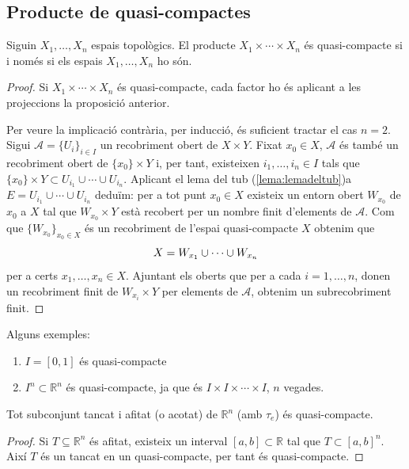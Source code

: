 \documentclass[../main.tex]{subfiles}
\begin{document}
\subsection{Producte de quasi-compactes}

\begin{ter}
\label{ter:productedespaisqc} Siguin $X_1,\ldots,X_n$ espais topològics. El producte $X_1\times \cdots\times X_n$ és quasi-compacte si i només si els espais $X_1,\ldots,X_n$ ho són.
\end{ter}
\begin{proof}
Si $X_1\times \cdots\times X_n$ és quasi-compacte, cada factor ho és aplicant a les projeccions la proposició anterior.

Per veure la implicació contrària, per inducció, és suficient tractar el cas $n = 2$. Sigui $\mathcal{A}=\{U_i\}_{i\in I}$ un recobriment obert de $X\times Y$. Fixat $x_0\in X$, $\mathcal{A}$ és també un recobriment obert de $\{x_0\}\times Y$ i, per tant, existeixen $i_1,\ldots,i_n\in I$ tals que $\{x_0\}\times Y\subset U_{i_1}\cup\cdots\cup U_{i_n}$. Aplicant el lema del tub (\ref{lema:lemadeltub})a $E = U_{i_1}\cup\cdots\cup U_{i_n}$ deduïm: per a tot punt $x_0\in X$ existeix un entorn obert $W_{x_0}$ de $x_0$ a $X$ tal que $W_{x_0}\times Y$ està recobert per un nombre finit d'elements de $\mathcal{A}$. Com que $\{W_{x_0}\}_{x_0\in X}$ és un recobriment de l'espai quasi-compacte $X$ obtenim que 
\begin{equation}
    \notag
    X = W_{x_1}\cup\cdots\cup W_{x_n}
\end{equation}
per a certs $x_1,\ldots,x_n\in X$. Ajuntant els oberts que per a cada $i=1,\ldots,n$, donen un recobriment finit de $W_{x_i}\times Y$ per elements de $\mathcal{A}$, obtenim un subrecobriment finit.
\end{proof}

\begin{ej}
\label{ej:producteqc} Alguns exemples:
\begin{enumerate}[(1)]
    \item $I = [0,1]$ és quasi-compacte
    \item $I^n\subset\mathbb{R}^n$ és quasi-compacte, ja que és $I\times I\times\cdots\times I$, $n$ vegades.
\end{enumerate}
\end{ej}

\begin{coro}
\label{coro:producteeq} Tot subconjunt tancat i afitat (o acotat) de $\mathbb{R}^n$ (amb $\tau_e$) és quasi-compacte.
\end{coro}
\begin{proof}
 Si $T\subseteq\mathbb{R}^n$ és afitat, existeix un interval $[a,b]\subset\mathbb{R}$ tal que $T\subset[a,b]^n$. Així $T$ és un tancat en un quasi-compacte, per tant és quasi-compacte. 
\end{proof}
\end{document}
